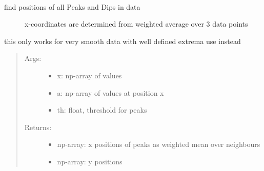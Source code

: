 \documentclass[letterpaper,10pt,english]{sphinxmanual}
\begin{document}
\begin{fulllineitems}
\label{\detokenize{index:PhyPraKit.PhyPraKit.simplePeakfinder}}~\begin{description}
\item[{find positions of all Peaks and Dips in data}] \leavevmode
x-coordinates are determined from weighted average over 3 data points

\end{description}

this only works for very smooth data with well defined extrema
use  instead
\begin{quote}
\begin{description}
\item[{Args:}] \leavevmode\begin{itemize}
\item {} 
x: np-array of values

\item {} 
a: np-array of values at position x

\item {} 
th: float, threshold for peaks

\end{itemize}

\item[{Returns:}] \leavevmode\begin{itemize}
\item {} 
np-array: x positions of peaks as weighted mean over neighbours

\item {} 
np-array: y positions

\end{itemize}

\end{description}
\end{quote}

\end{fulllineitems}

\end{document}
